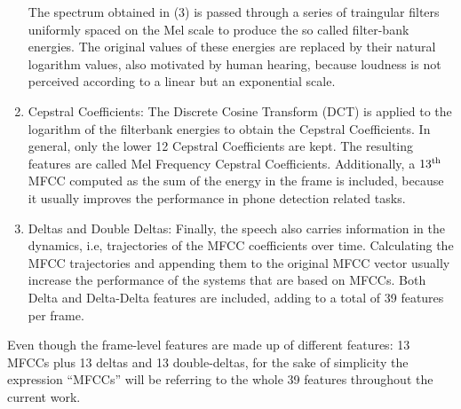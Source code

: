 \begin{enumerate}
  The spectrum obtained in (3) is passed through a series of traingular filters
  uniformly spaced on the Mel scale to produce the so called filter-bank energies.
  The original values of these energies are replaced by their natural logarithm values,
  also motivated by human hearing, because loudness is not perceived according to
  a linear but an exponential scale.

  \item Cepstral Coefficients: The Discrete Cosine Transform (DCT) is applied to the logarithm
  of the filterbank energies to obtain the Cepstral Coefficients. In general, only the lower
  12 Cepstral Coefficients are kept. The resulting features are called Mel Frequency
  Cepstral Coefficients. Additionally, a $13\textsuperscript{th}$ MFCC computed
  as the sum of the energy in the frame is included,
  because it usually improves the performance in phone detection
  related tasks.

  \item Deltas and Double Deltas: Finally, the speech also carries information
  in the dynamics, i.e, trajectories of the MFCC coefficients over time. Calculating
  the MFCC trajectories and appending them to the original MFCC vector usually increase the
  performance of the systems that are based on MFCCs.
  Both Delta and Delta-Delta features are included, adding to
  a total of 39 features per frame.

\end{enumerate}

Even though the frame-level features are made up of different features: 13 MFCCs plus 13 deltas
and 13 double-deltas, for the sake of simplicity the expression ``MFCCs''
will be referring to the whole 39 features throughout the current work.
